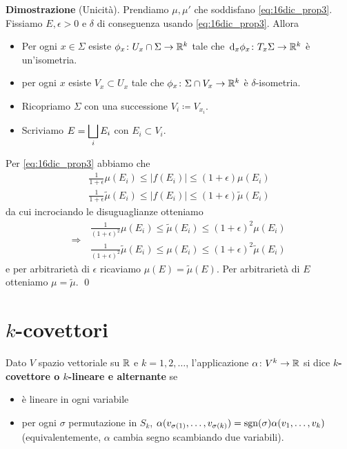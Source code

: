 \textbf{Dimostrazione} (Unicità). 
Prendiamo $\mu,\mu'$ che soddisfano \eqref{eq:16dic_prop3}.
Fissiamo $E,\epsilon > 0$ e $\delta$ di conseguenza usando \eqref{eq:16dic_prop3}. Allora
\begin{itemize}

	\item Per ogni $x \in \Sigma$ esiste $\phi_x \colon U_x \cap \Sigma \to \mathbb R^k$ tale che $\,\mathrm{d}_x \phi_x \colon T_x \Sigma \to \mathbb R^k$ è un'isometria.


	\item per ogni $x$ esiste $V_x \subset U_x$ tale che $\phi_x \colon \Sigma \cap V_x \to \mathbb R^k$ è $\delta$-isometria.


	\item Ricopriamo $\Sigma$ con una successione $V_i \coloneqq V_{x_i}$.


	\item Scriviamo $\displaystyle E = \bigsqcup_i E_i$ con $E_i \subset V_i$.

\end{itemize}
 
Per \eqref{eq:16dic_prop3} abbiamo che
%
\begin{gather*}
	\frac{1}{1+\epsilon} \mu(E_i) \leq |f(E_i)| \leq (1+\epsilon) \mu(E_i) \\
	\frac{1}{1+\epsilon} \tilde{\mu}(E_i) \leq |f(E_i)| \leq (1+\epsilon) \tilde{\mu}(E_i)
\end{gather*}
da cui incrociando le disuguaglianze otteniamo
$$
\Longrightarrow \;
\begin{gathered}
	\frac{1}{(1+\epsilon)^2} \mu(E_i) \leq \tilde \mu(E_i) \leq (1+\epsilon)^2 \mu(E_i) \\
	\frac{1}{(1+\epsilon)^2} \tilde \mu(E_i) \leq \mu(E_i) \leq (1+\epsilon)^2 \tilde \mu(E_i)
\end{gathered}
$$
e per arbitrarietà di $\epsilon$ ricaviamo $\mu(E) = \tilde{\mu}(E)$. Per arbitrarietà di $E$ otteniamo $\mu = \tilde{\mu}$.
\qed


\section{$k$-covettori}

Dato $V$ spazio vettoriale su $\mathbb R$ e $k=1,2,\ldots$, l'applicazione $\alpha \colon  V^k \to \mathbb R$ si dice \textbf{$k$-covettore o $k$-lineare e alternante} se
\begin{itemize}

	\item è lineare in ogni variabile

	\item per ogni $\sigma$ permutazione in $S_k$, $\alpha(v_{\sigma(1)},\ldots,v_{\sigma(k)}) = \operatorname{sgn}(\sigma) \alpha(v_1,\ldots,v_k)$ (equivalentemente, $\alpha$ cambia segno scambiando due variabili).

\end{itemize}

